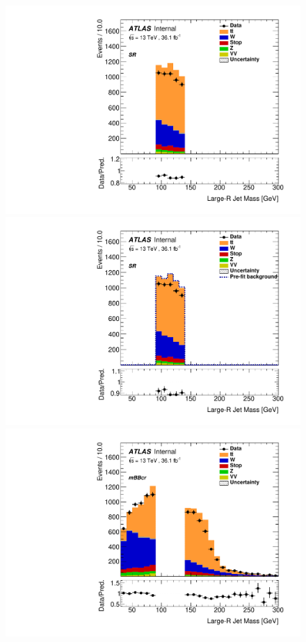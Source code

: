 \begin{figure}[!htbp]
\begin{center}
\includegraphics[scale=0.33]{./figures/boosted/ABCD_1tag0bjet/QCDFloat_1tag_SRmBBcrFit_SR_Mu_Prefit} 
\includegraphics[scale=0.33]{./figures/boosted/ABCD_1tag0bjet/QCDFloat_1tag_SRmBBcrFit_SR_Mu_Postfit}
\includegraphics[scale=0.33]{./figures/boosted/ABCD_1tag0bjet/QCDFloat_1tag_SRmBBcrFit_mBBcr_Mu_Prefit} 

\end{center}
\end{figure}
